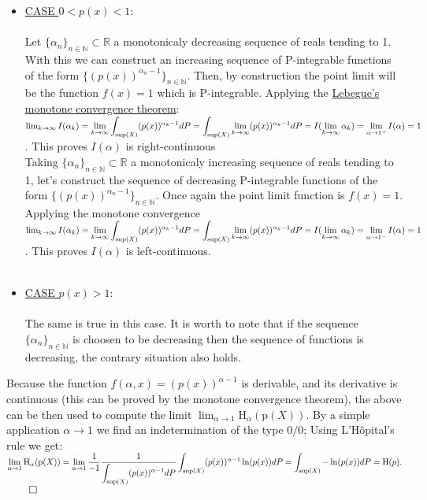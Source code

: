 \documentclass{exam}
\renewenvironment{proof}{{\noindent\itshape\ignorespaces}}{{\hfill$\qed$\\}}
\begin{document}
\begin{proof}
    \begin{itemize}
        \item \underline{CASE $0 < p(x) < 1$}:\\
        \\
        Let $\{\alpha_n\}_{n \in \mathbb{N}} \subset \mathbb{R}$ a monotonicaly decreasing sequence of reals tending to 1. With this we can construct an increasing sequence of P-integrable functions of the form $\{(p(x))^{\alpha_n -1}\}_{n \in \mathbb{N}}$. Then, by 
        construction the point limit will be the function $f(x) = 1$ which is P-integrable. Applying the \href{https://proofwiki.org/wiki/Monotone_Convergence_Theorem_(Measure_Theory)}{Lebegue's monotone convergence theorem}:\\
        $\lim_{k \to \infty} I(\alpha_k) = \displaystyle\lim_{k \to \infty} \int_{\tiny \text{sup}(X)}(p(x))^{\alpha_k-1} d P = \displaystyle\int_{\tiny \text{sup}(X)} \lim_{k \to \infty}(p(x))^{\alpha_k-1} d P  = I(\lim_{k \to \infty} \alpha_k) = \lim_{\alpha \to 1^{+}}I(\alpha) = 1$. This proves $I(\alpha)$ is right-continuous\newline
        \\
        Taking $\{\alpha_n\}_{n \in \mathbb{N}} \subset \mathbb{R}$ a monotonicaly increasing sequence of reals tending to 1, let's construct the sequence of decreasing P-integrable functions of the form $\{(p(x))^{\alpha_n -1}\}_{n \in \mathbb{N}}$. Once again the point limit function is $f(x) = 1$. Applying the monotone convergence \\
        $\lim_{k \to \infty} I(\alpha_k) = \displaystyle\lim_{k \to \infty} \int_{\tiny \text{sup}(X)}(p(x))^{\alpha_k-1} d P = \displaystyle\int_{\tiny \text{sup}(X)} \lim_{k \to \infty}(p(x))^{\alpha_k-1} d P  = I(\lim_{k \to \infty} \alpha_k) = \lim_{\alpha \to 1^{-}}I(\alpha) = 1$. This proves $I(\alpha)$ is left-continuous. \\\
        \item  \underline{CASE $p(x) > 1$}:\\
        \\
        The same is true in this case. It is worth to note that if the sequence $\{\alpha_n\}_{n \in \mathbb{N}}$ is choosen to be decreasing then the sequence of functions is decreasing, the contrary situation also holds.\\
    \end{itemize}    
    Because the function $f(\alpha,x) = (p(x))^{\alpha - 1}$ is derivable, and its derivative is continuous (this can be proved by the monotone convergence theorem), the above can be then used to compute the limit $\lim_{\alpha \to 1 }\text{H}_\alpha(\text{p}(X))$. By a simple
    application $\alpha \to 1$ we find an indetermination of the type $0/0$; Using L'Hôpital's rule we get:\\
    $\displaystyle\lim_{\alpha \to 1 }\text{H}_\alpha(\text{p}(X)) =\displaystyle\lim_{\alpha \to 1}\frac{1}{-1}\frac{1}{\displaystyle\int_{\tiny \text{sup}(X)}(p(x))^{\alpha-1} d P}\int_{\tiny \text{sup}(X)}(p(x))^{\alpha-1} \ln(p(x)) d P = \displaystyle \int_{\tiny \text{sup}(X)}-\ln(p(x)) d P = \text{H}(p).$
\end{proof}
\end{document}
